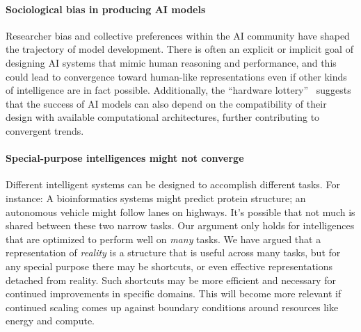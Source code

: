 \documentclass{article}
\theoremstyle{plain}
\theoremstyle{definition}
\theoremstyle{remark}
\begin{document}
\paragraph{Sociological bias in producing AI models}
Researcher bias and collective preferences within the AI community have shaped the trajectory of model development. %
There is often an explicit or implicit goal of designing AI systems that mimic human reasoning and performance, and this could lead to convergence toward human-like representations even if other kinds of intelligence are in fact possible. 
Additionally, the ``hardware lottery''~\cite{hooker2021hardware} suggests that the success of AI models can also depend on the compatibility of their design with available computational architectures, further contributing to convergent trends.

\paragraph{Special-purpose intelligences might not converge} 
Different intelligent systems can be designed to accomplish different tasks. For instance:
A bioinformatics systems might predict protein structure; 
an autonomous vehicle might follow lanes on highways. It's possible that not much is shared between these two narrow tasks. %
Our argument only holds for intelligences that are optimized to perform well on \textit{many} tasks. We have argued that a representation of \textit{reality} is a structure that is useful across many tasks, but for any special purpose there may be shortcuts, or even effective representations detached from reality. Such shortcuts may be more efficient and necessary for continued improvements in specific domains. This will become more relevant if continued scaling comes up against boundary conditions around resources like energy and compute.

\end{document}
